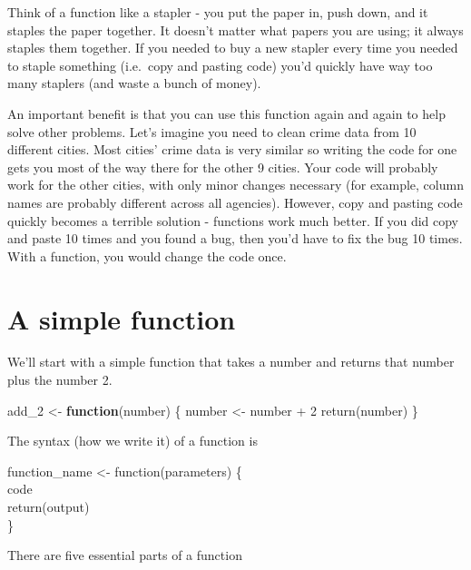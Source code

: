 \documentclass[
]{krantz}
\makeatletter
\newenvironment{Shaded}{\begin{snugshade}}{\end{snugshade}}
\newcommand{\ControlFlowTok}[1]{\textcolor[rgb]{0.27,0.27,0.27}{\textbf{#1}}}
\newcommand{\DecValTok}[1]{\textcolor[rgb]{0.06,0.06,0.06}{#1}}
\newcommand{\FunctionTok}[1]{\textcolor[rgb]{0,0,0}{#1}}
\newcommand{\NormalTok}[1]{#1}
\newcommand{\OtherTok}[1]{\textcolor[rgb]{0.37,0.37,0.37}{#1}}
\newcommand{\SpecialCharTok}[1]{\textcolor[rgb]{0,0,0}{#1}}
\newenvironment{kframe}{%
\medskip{}
\setlength{\fboxsep}{.8em}
 \def\at@end@of@kframe{}%
 \ifinner\ifhmode%
  \def\at@end@of@kframe{\end{minipage}}%
  \begin{minipage}{\columnwidth}%
 \fi\fi%
 \def\FrameCommand##1{\hskip\@totalleftmargin \hskip-\fboxsep
 \colorbox{shadecolor}{##1}\hskip-\fboxsep
     \hskip-\linewidth \hskip-\@totalleftmargin \hskip\columnwidth}%
 \MakeFramed {\advance\hsize-\width
   \@totalleftmargin\z@ \linewidth\hsize
   \@setminipage}}%
 {\par\unskip\endMakeFramed%
 \at@end@of@kframe}
\renewenvironment{Shaded}{\begin{kframe}}{\end{kframe}}
\makeatother
\begin{document}
Think of a function like a stapler - you put the paper in,
push down, and it staples the paper together. It doesn't
matter what papers you are using; it always staples them
together. If you needed to buy a new stapler every time you
needed to staple something (i.e.~copy and pasting code)
you'd quickly have way too many staplers (and waste a bunch
of money).

An important benefit is that you can use this function again
and again to help solve other problems. Let's imagine you
need to clean crime data from 10 different cities. Most
cities' crime data is very similar so writing the code for
one gets you most of the way there for the other 9 cities.
Your code will probably work for the other cities, with only
minor changes necessary (for example, column names are
probably different across all agencies). However, copy and
pasting code quickly becomes a terrible solution - functions
work much better. If you did copy and paste 10 times and you
found a bug, then you'd have to fix the bug 10 times. With a
function, you would change the code once.

\hypertarget{a-simple-function}{%
\section{A simple function}\label{a-simple-function}}

We'll start with a simple function that takes a number and
returns that number plus the number 2.

\begin{Shaded}
\begin{Highlighting}[]
\NormalTok{add\_2 }\OtherTok{\textless{}{-}} \ControlFlowTok{function}\NormalTok{(number) \{}
\NormalTok{  number }\OtherTok{\textless{}{-}}\NormalTok{ number }\SpecialCharTok{+} \DecValTok{2}
  \FunctionTok{return}\NormalTok{(number)}
\NormalTok{\}}
\end{Highlighting}
\end{Shaded}

The syntax (how we write it) of a function is

function\_name \textless- function(parameters) \{\\
code\\
return(output)\\
\}

There are five essential parts of a function
\end{document}
